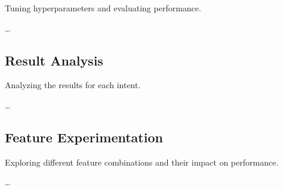         Tuning hyperparameters and evaluating performance.

        \ldots
        
    \subsection{Result Analysis}
    
        Analyzing the results for each intent.

        \ldots
        
    \subsection{Feature Experimentation}
    
        Exploring different feature combinations and their impact on performance.

        \ldots
